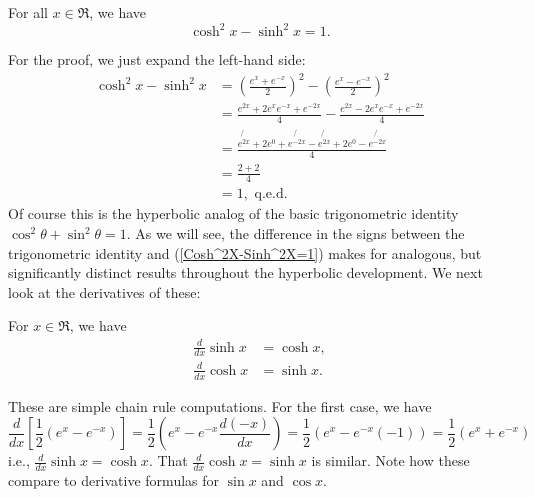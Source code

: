 \begin{theorem}  For all $x\in\Re$, we have
\begin{equation}\cosh^2x-\sinh^2x=1.\label{Cosh^2X-Sinh^2X=1}
\end{equation}
\end{theorem}
For the proof, we just expand the left-hand side:
\begin{align*}
\cosh^2x-\sinh^2x&=\left(\frac{e^x+e^{-x}}2\right)^2
                   -\left(\frac{e^x-e^{-x}}2\right)^2\\
                  &=\frac{e^{2x}+2e^xe^{-x}+e^{-2x}}4
                   -\frac{e^{2x}-2e^xe^{-x}+e^{-2x}}4\\
                  &=\frac{\not{e^{2x}}+2e^0+\not{e^{-2x}}-
                   \not{e^{2x}}+2e^0-\not{e^{-2x}}}4\\
                  &=\frac{2+2}4\\
                  &=1,\text{ q.e.d.}\end{align*}
Of course this is the hyperbolic analog of the basic trigonometric
identity $\cos^2\theta+\sin^2\theta=1$.  As we will see, the 
difference in the signs between the trigonometric identity
and (\ref{Cosh^2X-Sinh^2X=1}) makes for analogous, but significantly
distinct results throughout the hyperbolic development.  We next
look at the derivatives of these:
\begin{theorem} For $x\in\Re$, we have
\begin{align}
\frac{d}{dx}\sinh x&=\cosh x, \label{DerivSinhX}\\
\frac{d}{dx}\cosh x&=\sinh x. \label{DerivCoshX}
\end{align}
\end{theorem}
These are simple chain rule computations.  For the first
case, we have
$$
\frac{d}{dx}\left[\frac12\left(e^x-e^{-x}\right)\right]
=\frac12\left(e^x-e^{-x}\frac{d(-x)}{dx}\right)
=\frac12\left(e^x-e^{-x}(-1)\right)
=\frac12\left(e^x+e^{-x}\right)$$
i.e., $\frac{d}{dx}\sinh x=\cosh x$.
That $\frac{d}{dx}\cosh x=\sinh x$ is similar.  Note
how these compare to derivative formulas for $\sin x$ and
$\cos x$.
